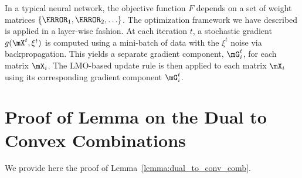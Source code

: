 \documentclass[smallextended,referee,envcountsect]{svjour3}
\newcommand{\lemmaref}[1]{Lemma~\ref{#1}}
\begin{document}
 In a typical neural network, the objective function $F$ depends on a set of weight matrices $\{ \mW_1, \mW_2, \ldots \}$. The optimization framework we have described is applied in a layer-wise fashion. At each iteration $t$, a stochastic gradient $g(\mX^t, \xi^t)$ is computed using a mini-batch of data with the $\xi^t$ noise via backpropagation. This yields a separate gradient component, $\mG_i^t$, for each matrix $\mX_i$. The LMO-based update rule is then applied to each matrix $\mX_i$ using its corresponding gradient component $\mG_i^t$.
 
 \section{Proof of Lemma on the Dual to Convex Combinations}\label{sec:proof_dual_conv_comb}
 
 We provide here the proof of \lemmaref{lemma:dual_to_conv_comb}.
 
\end{document}
